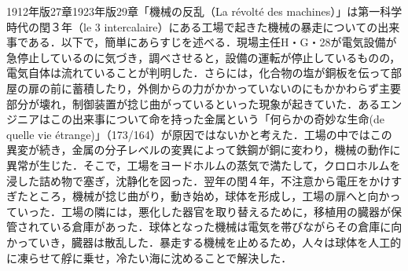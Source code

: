 1912年版27章1923年版29章「機械の反乱（La révolté des machines）」は第一科学時代の閏３年（le 3 intercalaire）にある工場で起きた機械の暴走についての出来事である．以下で，簡単にあらすじを述べる．現場主任H・G・28が電気設備が急停止しているのに気づき，調べさせると，設備の運転が停止しているものの，電気自体は流れていることが判明した．さらには，化合物の塩が銅板を伝って部屋の扉の前に蓄積したり，外側からの力がかかっていないのにもかかわらず主要部分が壊れ，制御装置が捻じ曲がっているといった現象が起きていた．あるエンジニアはこの出来事について命を持った金属という「何らかの奇妙な生命(de quelle vie étrange)」（173/164）が原因ではないかと考えた．工場の中ではこの異変が続き，金属の分子レベルの変異によって鉄鋼が銅に変わり，機械の動作に異常が生じた．そこで，工場をヨードホルムの蒸気で満たして，クロロホルムを浸した詰め物で塞ぎ，沈静化を図った．翌年の閏４年，不注意から電圧をかけすぎたところ，機械が捻じ曲がり，動き始め，球体を形成し，工場の扉へと向かっていった．工場の隣には，悪化した器官を取り替えるために，移植用の臓器が保管されている倉庫があった．球体となった機械は電気を帯びながらその倉庫に向かっていき，臓器は散乱した．暴走する機械を止めるため，人々は球体を人工的に凍らせて艀に乗せ，冷たい海に沈めることで解決した．

